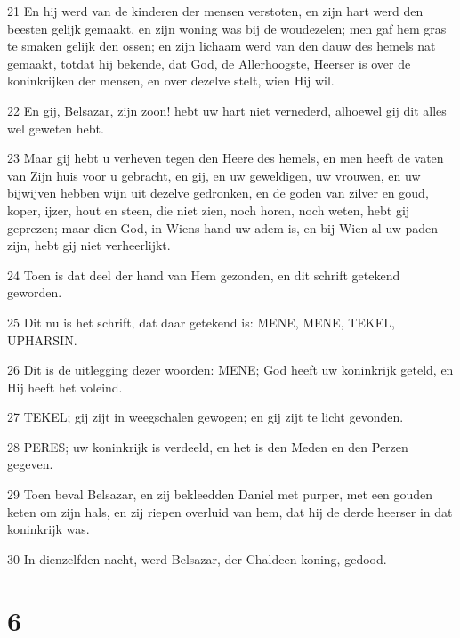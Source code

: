 \par 21 En hij werd van de kinderen der mensen verstoten, en zijn hart werd den beesten gelijk gemaakt, en zijn woning was bij de woudezelen; men gaf hem gras te smaken gelijk den ossen; en zijn lichaam werd van den dauw des hemels nat gemaakt, totdat hij bekende, dat God, de Allerhoogste, Heerser is over de koninkrijken der mensen, en over dezelve stelt, wien Hij wil.
\par 22 En gij, Belsazar, zijn zoon! hebt uw hart niet vernederd, alhoewel gij dit alles wel geweten hebt.
\par 23 Maar gij hebt u verheven tegen den Heere des hemels, en men heeft de vaten van Zijn huis voor u gebracht, en gij, en uw geweldigen, uw vrouwen, en uw bijwijven hebben wijn uit dezelve gedronken, en de goden van zilver en goud, koper, ijzer, hout en steen, die niet zien, noch horen, noch weten, hebt gij geprezen; maar dien God, in Wiens hand uw adem is, en bij Wien al uw paden zijn, hebt gij niet verheerlijkt.
\par 24 Toen is dat deel der hand van Hem gezonden, en dit schrift getekend geworden.
\par 25 Dit nu is het schrift, dat daar getekend is: MENE, MENE, TEKEL, UPHARSIN.
\par 26 Dit is de uitlegging dezer woorden: MENE; God heeft uw koninkrijk geteld, en Hij heeft het voleind.
\par 27 TEKEL; gij zijt in weegschalen gewogen; en gij zijt te licht gevonden.
\par 28 PERES; uw koninkrijk is verdeeld, en het is den Meden en den Perzen gegeven.
\par 29 Toen beval Belsazar, en zij bekleedden Daniel met purper, met een gouden keten om zijn hals, en zij riepen overluid van hem, dat hij de derde heerser in dat koninkrijk was.
\par 30 In dienzelfden nacht, werd Belsazar, der Chaldeen koning, gedood.

\chapter{6}

